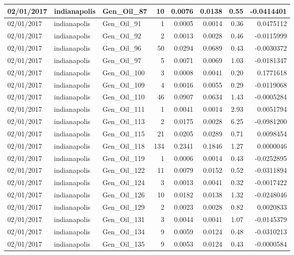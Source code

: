 \documentclass[
  letterpaper,
  DIV=11,
  numbers=noendperiod]{scrartcl}
\begin{document}
\begin{tabular}{l|l|l|r|r|r|r|r}
\hline
02/01/2017 & indianapolis & Gen\_Oil\_87 & 10 & 0.0076 & 0.0138 & 0.55 & -0.0414401\\
\hline
02/01/2017 & indianapolis & Gen\_Oil\_91 & 1 & 0.0005 & 0.0014 & 0.36 & 0.0475112\\
\hline
02/01/2017 & indianapolis & Gen\_Oil\_92 & 2 & 0.0013 & 0.0028 & 0.46 & -0.0115999\\
\hline
02/01/2017 & indianapolis & Gen\_Oil\_96 & 50 & 0.0294 & 0.0689 & 0.43 & -0.0030372\\
\hline
02/01/2017 & indianapolis & Gen\_Oil\_97 & 5 & 0.0071 & 0.0069 & 1.03 & -0.0181347\\
\hline
02/01/2017 & indianapolis & Gen\_Oil\_100 & 3 & 0.0008 & 0.0041 & 0.20 & 0.1771618\\
\hline
02/01/2017 & indianapolis & Gen\_Oil\_109 & 4 & 0.0016 & 0.0055 & 0.29 & -0.0119068\\
\hline
02/01/2017 & indianapolis & Gen\_Oil\_110 & 46 & 0.0907 & 0.0634 & 1.43 & -0.0005284\\
\hline
02/01/2017 & indianapolis & Gen\_Oil\_111 & 1 & 0.0041 & 0.0014 & 2.93 & 0.0051794\\
\hline
02/01/2017 & indianapolis & Gen\_Oil\_113 & 2 & 0.0175 & 0.0028 & 6.25 & -0.0981200\\
\hline
02/01/2017 & indianapolis & Gen\_Oil\_115 & 21 & 0.0205 & 0.0289 & 0.71 & 0.0098454\\
\hline
02/01/2017 & indianapolis & Gen\_Oil\_118 & 134 & 0.2341 & 0.1846 & 1.27 & 0.0000046\\
\hline
02/01/2017 & indianapolis & Gen\_Oil\_119 & 1 & 0.0006 & 0.0014 & 0.43 & -0.0252895\\
\hline
02/01/2017 & indianapolis & Gen\_Oil\_122 & 11 & 0.0079 & 0.0152 & 0.52 & -0.0311894\\
\hline
02/01/2017 & indianapolis & Gen\_Oil\_124 & 3 & 0.0013 & 0.0041 & 0.32 & -0.0017422\\
\hline
02/01/2017 & indianapolis & Gen\_Oil\_126 & 10 & 0.0182 & 0.0138 & 1.32 & -0.0248046\\
\hline
02/01/2017 & indianapolis & Gen\_Oil\_129 & 2 & 0.0023 & 0.0028 & 0.82 & 0.0020833\\
\hline
02/01/2017 & indianapolis & Gen\_Oil\_131 & 3 & 0.0044 & 0.0041 & 1.07 & -0.0145379\\
\hline
02/01/2017 & indianapolis & Gen\_Oil\_134 & 9 & 0.0059 & 0.0124 & 0.48 & -0.0310213\\
\hline
02/01/2017 & indianapolis & Gen\_Oil\_135 & 9 & 0.0053 & 0.0124 & 0.43 & -0.0000584\\

\end{tabular}
\end{document}
